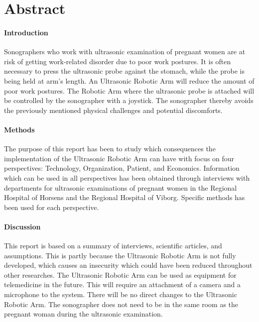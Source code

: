 \chapter{Abstract} 
\subsubsection{Introduction}
Sonographers who work with ultrasonic examination of pregnant women are at risk of getting work-related disorder due to poor work postures. It is often necessary to press the ultrasonic probe against the stomach, while the probe is being held at arm’s length. An Ultrasonic Robotic Arm will reduce the amount of poor work postures. The Robotic Arm where the ultrasonic probe is attached will be controlled by the sonographer with a joystick. The sonographer thereby avoids the previously mentioned physical challenges and potential discomforts. 

\subsubsection{Methods}
The purpose of this report has been to study which consequences the implementation of the Ultrasonic Robotic Arm can have with focus on four perspectives: Technology, Organization, Patient, and Economics. 
Information which can be used in all perspectives has been obtained through interviews with departments for ultrasonic examinations of pregnant women in the Regional Hospital of Horsens and the Regional Hospital of Viborg. Specific methods has been used for each perspective.

\subsubsection{Discussion}
This report is based on a summary of interviews, scientific articles, and assumptions. This is partly because the Ultrasonic Robotic Arm is not fully developed, which causes an insecurity which could have been reduced throughout other researches. 
The Ultrasonic Robotic Arm can be used as equipment for telemedicine in the future. This will require an attachment of a camera and a microphone to the system. There will be no direct changes to the Ultrasonic Robotic Arm. The sonographer does not need to be in the same room as the pregnant woman during the ultrasonic examination. 

